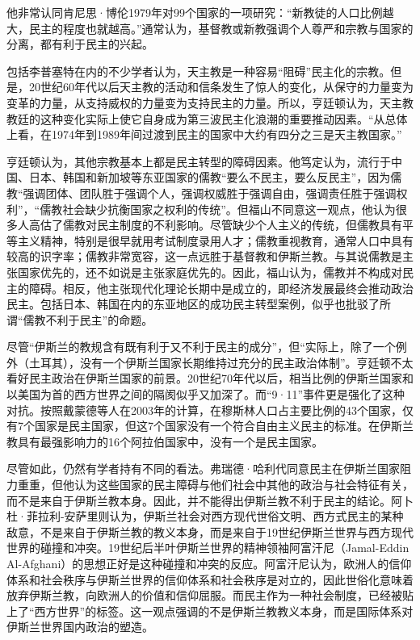 他非常认同肯尼思·博伦1979年对99个国家的一项研究：“新教徒的人口比例越大，民主的程度也就越高。”通常认为，基督教或新教强调个人尊严和宗教与国家的分离，都有利于民主的兴起。

包括李普塞特在内的不少学者认为，天主教是一种容易“阻碍”民主化的宗教。但是，20世纪60年代以后天主教的活动和信条发生了惊人的变化，从保守的力量变为变革的力量，从支持威权的力量变为支持民主的力量。所以，亨廷顿认为，天主教教廷的这种变化实际上使它自身成为第三波民主化浪潮的重要推动因素。“从总体上看，在1974年到1989年间过渡到民主的国家中大约有四分之三是天主教国家。”

亨廷顿认为，其他宗教基本上都是民主转型的障碍因素。他笃定认为，流行于中国、日本、韩国和新加坡等东亚国家的儒教“要么不民主，要么反民主”，因为儒教“强调团体、团队胜于强调个人，强调权威胜于强调自由，强调责任胜于强调权利”，“儒教社会缺少抗衡国家之权利的传统”。但福山不同意这一观点，他认为很多人高估了儒教对民主制度的不利影响。尽管缺少个人主义的传统，但儒教具有平等主义精神，特别是很早就用考试制度录用人才；儒教重视教育，通常人口中具有较高的识字率；儒教非常宽容，这一点远胜于基督教和伊斯兰教。与其说儒教是主张国家优先的，还不如说是主张家庭优先的。因此，福山认为，儒教并不构成对民主的障碍。相反，他主张现代化理论长期中是成立的，即经济发展最终会推动政治民主。包括日本、韩国在内的东亚地区的成功民主转型案例，似乎也批驳了所谓“儒教不利于民主”的命题。

尽管“伊斯兰的教规含有既有利于又不利于民主的成分”，但“实际上，除了一个例外（土耳其），没有一个伊斯兰国家长期维持过充分的民主政治体制”。亨廷顿不太看好民主政治在伊斯兰国家的前景。20世纪70年代以后，相当比例的伊斯兰国家和以美国为首的西方世界之间的隔阂似乎又加深了。而“9·11”事件更是强化了这种对抗。按照戴蒙德等人在2003年的计算，在穆斯林人口占主要比例的43个国家，仅有7个国家是民主国家，但这7个国家没有一个符合自由主义民主的标准。在伊斯兰教具有最强影响力的16个阿拉伯国家中，没有一个是民主国家。

尽管如此，仍然有学者持有不同的看法。弗瑞德·哈利代同意民主在伊斯兰国家阻力重重，但他认为这些国家的民主障碍与他们社会中其他的政治与社会特征有关，而不是来自于伊斯兰教本身。因此，并不能得出伊斯兰教不利于民主的结论。阿卜杜·菲拉利-安萨里则认为，伊斯兰社会对西方现代世俗文明、西方式民主的某种敌意，不是来自于伊斯兰教的教义本身，而是来自于19世纪伊斯兰世界与西方现代世界的碰撞和冲突。19世纪后半叶伊斯兰世界的精神领袖阿富汗尼（Jamal-Eddin Al-Afghani）的思想正好是这种碰撞和冲突的反应。阿富汗尼认为，欧洲人的信仰体系和社会秩序与伊斯兰世界的信仰体系和社会秩序是对立的，因此世俗化意味着放弃伊斯兰教，向欧洲人的价值和信仰屈服。而民主作为一种社会制度，已经被贴上了“西方世界”的标签。这一观点强调的不是伊斯兰教教义本身，而是国际体系对伊斯兰世界国内政治的塑造。

